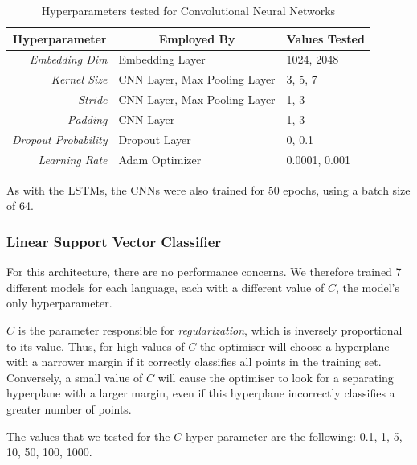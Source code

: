 \documentclass[letterpaper,11pt]{article}
\begin{document}
\begin{table}[H]
  \centering
  \begin{tabular}{@{}rll@{}}
  \toprule
  \multicolumn{1}{c}{\textbf{Hyperparameter}} & \multicolumn{1}{c}{\textbf{Employed By}} & \textbf{Values Tested} \\ \midrule
  \textit{Embedding Dim}                   & Embedding Layer                          & 1024, 2048             \\
  \textit{Kernel Size}                   & CNN Layer, Max Pooling Layer             & 3, 5, 7                \\
  \textit{Stride}                   & CNN Layer, Max Pooling Layer             & 1, 3                   \\
  \textit{Padding}                   & CNN Layer                                & 1, 3                   \\
  \textit{Dropout Probability}                   & Dropout Layer                            & 0, 0.1         \\
  \textit{Learning Rate}                   & Adam Optimizer                           & 0.0001, 0.001                 \\ \bottomrule
  \end{tabular}
  \caption{Hyperparameters tested for Convolutional Neural Networks}
  \label{table:CNN_hyperparameters}
\end{table}


As with the LSTMs, the CNNs were also trained for 50 epochs, using a batch size of 64.

\subsubsection*{Linear Support Vector Classifier}

For this architecture, there are no performance concerns. We therefore trained 7 different models for each language, each with a different value of $C$, the model's only hyperparameter.

$C$ is the parameter responsible for \textit{regularization}, which is inversely proportional to its value. Thus, for high values of $C$ the optimiser will choose a hyperplane with a narrower margin if it correctly classifies all points in the training set. Conversely, a small value of $C$ will cause the optimiser to look for a separating hyperplane with a larger margin, even if this hyperplane incorrectly classifies a greater number of points. 

The values that we tested for the $C$ hyper-parameter are the following: 0.1, 1, 5, 10, 50, 100, 1000.
\end{document}
